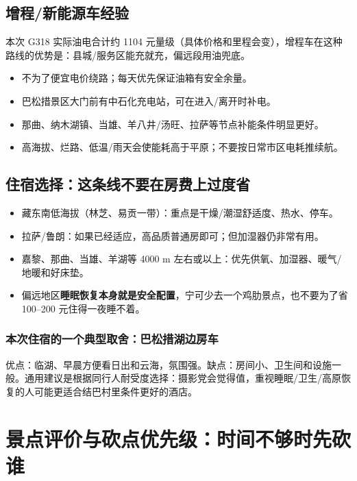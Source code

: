 \documentclass[10.5pt,a4paper]{ctexart}
\begin{document}
\subsection{增程/新能源车经验}
本次 G318 实际油电合计约 1104 元量级（具体价格和里程会变），增程车在这种路线的优势是：县城/服务区能充就充，偏远段用油兜底。

\begin{itemize}
  \item 不为了便宜电价绕路；每天优先保证油箱有安全余量。
  \item 巴松措景区大门前有中石化充电站，可在进入/离开时补电。
  \item 那曲、纳木湖镇、当雄、羊八井/汤旺、拉萨等节点补能条件明显更好。
  \item 高海拔、烂路、低温/雨天会使能耗高于平原；不要按日常市区电耗推续航。
\end{itemize}

\subsection{住宿选择：这条线不要在房费上过度省}
\begin{itemize}
  \item 藏东南低海拔（林芝、易贡一带）：重点是干燥/潮湿舒适度、热水、停车。
  \item 拉萨/鲁朗：如果已经适应，高品质普通房即可；但加湿器仍非常有用。
  \item 嘉黎、那曲、当雄、羊湖等 4000 m 左右或以上：优先供氧、加湿器、暖气/地暖和好床垫。
  \item 偏远地区\textbf{睡眠恢复本身就是安全配置}，宁可少去一个鸡肋景点，也不要为了省 100--200 元住得一夜睡不着。
\end{itemize}

\subsubsection{本次住宿的一个典型取舍：巴松措湖边房车}
优点：临湖、早晨方便看日出和云海，氛围强。缺点：房间小、卫生间和设施一般。通用建议是根据同行人耐受度选择：摄影党会觉得值，重视睡眠/卫生/高原恢复的人可能更适合结巴村里条件更好的酒店。

\section{景点评价与砍点优先级：时间不够时先砍谁}
\end{document}
